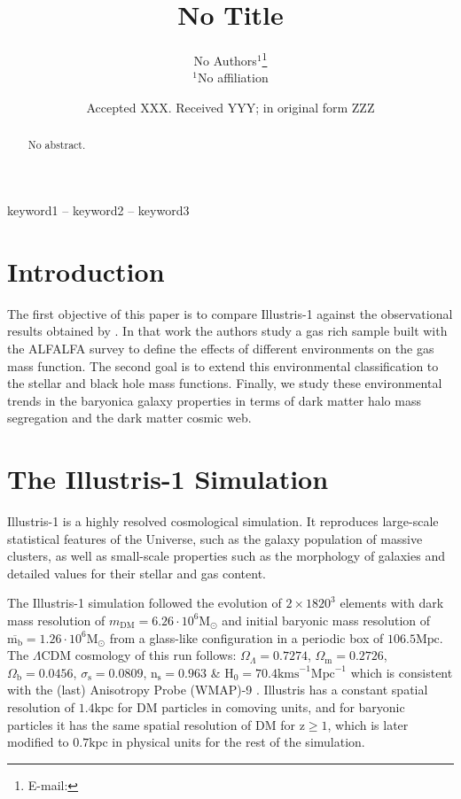 \documentclass[a4paper,fleqn,usenatbib]{mnras}
\title[No Title]{No Title}
\author[No Author et al.]{
No Authors$^{1}$\thanks{E-mail: }\\
$^{1}$No affiliation\\
}
\date{Accepted XXX. Received YYY; in original form ZZZ}
\begin{document}
\label{firstpage}
\pagerange{\pageref{firstpage}--\pageref{lastpage}}
\maketitle

\begin{abstract}
No abstract.
\end{abstract}

\begin{keywords}
keyword1 -- keyword2 -- keyword3
\end{keywords}



\section{Introduction}


The first objective of this paper is to compare Illustris-1 against 
the observational results obtained by \cite{Jones2016}.
In that work the authors study a gas rich sample built with the
ALFALFA survey to define the effects of different environments on the
gas mass function.
The second goal is to extend this environmental classification to 
the stellar and black hole mass functions. 
Finally, we study these environmental trends in the baryonica galaxy
properties in terms of dark matter halo mass segregation and the dark
matter cosmic web. 

\section{The Illustris-1 Simulation}
Illustris-1 is a highly resolved cosmological simulation. 
It reproduces large-scale statistical features of the Universe, such
as the galaxy population of massive clusters, as well as small-scale
properties such as the morphology of galaxies and detailed values for
their stellar and gas content.  

The Illustris-1 simulation followed  the evolution of $2 \times 1820^3$
elements with dark mass resolution of $m_{\text{DM}} = 6.26\cdot
10^6\text{M}_{\odot}$ and initial baryonic mass resolution of
$\overline{\text{m}_\text{b}}=1.26\cdot 10^6\text{M}_{\odot}$ from a
glass-like configuration in a periodic box of $106.5\text{Mpc}$. The
$\Lambda \text{CDM}$ cosmology of this run follows:
$\Omega_\Lambda=0.7274$, $\Omega_\text{m}=0.2726$,
$\Omega_\text{b}=0.0456$, $\sigma_\text{s}=0.0809$,
$\text{n}_\text{s}=0.963$ \& $\text{H}_0=70.4\text{kms} 
^{-1}\text{Mpc}^{-1}$ which is consistent with the (last) Anisotropy
Probe (WMAP)-9 \cite{AnisotropyProbe}. Illustris has a constant
spatial resolution of $1.4\text{kpc}$ for DM particles in comoving
units, and for baryonic particles it has the same spatial resolution
of DM for $\text{z}\geq 1$, which is later modified to $0.7\text{kpc}$
in physical units for the rest of the simulation. \\ 
\end{document}
